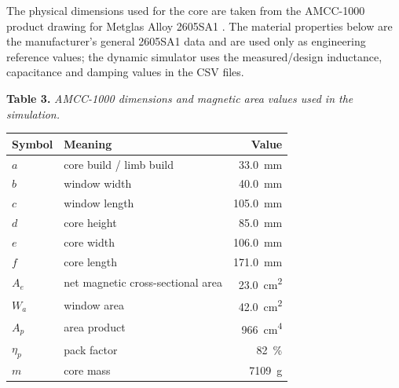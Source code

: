 The physical dimensions used for the core are taken from the AMCC-1000 product
drawing for Metglas Alloy 2605SA1 \cite{metglas2605sa1}. The material properties below are the
manufacturer's general 2605SA1 data and are used only as engineering reference
values; the dynamic simulator uses the measured/design inductance,
capacitance and damping values in the CSV files.

\begin{table}[H]
\centering
\textbf{Table 3.} \emph{AMCC-1000 dimensions and magnetic area values used in the simulation.}

\smallskip
\begin{tabular}{llr}
\toprule
Symbol & Meaning & Value \\
\midrule
\(a\) & core build / limb build & \SI{33.0}{\milli\metre} \\
\(b\) & window width & \SI{40.0}{\milli\metre} \\
\(c\) & window length & \SI{105.0}{\milli\metre} \\
\(d\) & core height & \SI{85.0}{\milli\metre} \\
\(e\) & core width & \SI{106.0}{\milli\metre} \\
\(f\) & core length & \SI{171.0}{\milli\metre} \\
\(A_e\) & net magnetic cross-sectional area & \SI{23.0}{\centi\metre\squared} \\
\(W_a\) & window area & \SI{42.0}{\centi\metre\squared} \\
\(A_p\) & area product & \SI{966}{\centi\metre\tothe{4}} \\
\(\eta_p\) & pack factor & \SI{82}{\percent} \\
\(m\) & core mass & \SI{7109}{\gram} \\
\bottomrule
\end{tabular}
\end{table}

